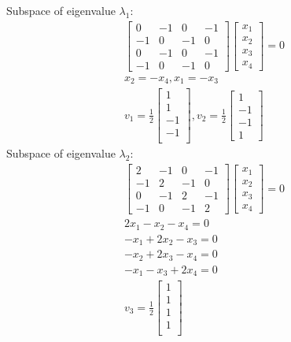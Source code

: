\documentclass{article}
\begin{document}
	Subspace of eigenvalue $\lambda_{1}$:
	\begin{gather*}
	\begin{bmatrix}	
	0 & -1 & 0 & -1\\
	-1 & 0 & -1 & 0\\
	0 & -1 & 0 & -1\\
	-1 & 0 & -1 & 0
	\end{bmatrix}\begin{bmatrix}
	x_{1}\\
	x_{2}\\
	x_{3}\\
	x_{4}
	\end{bmatrix}=0 \\
	x_{2}=-x_{4}, x_{1} = -x_{3} \\
	v_{1}=\frac{1}{2}\begin{bmatrix}
	1\\
	1\\
	-1\\
	-1\\
	\end{bmatrix},
	v_{2}=\frac{1}{2}\begin{bmatrix}
	1\\
	-1\\
	-1\\
	1
	\end{bmatrix}
	\end{gather*}
	Subspace of eigenvalue $\lambda_{2}$:
	\begin{gather*}
	\begin{bmatrix}	
	2 & -1 & 0 & -1\\
	-1 & 2 & -1 & 0\\
	0 & -1 & 2 & -1\\
	-1 & 0 & -1 & 2
	\end{bmatrix}\begin{bmatrix}
	x_{1}\\
	x_{2}\\
	x_{3}\\
	x_{4}
	\end{bmatrix}=0 \\
	2x_{1} -x_{2} -x_{4}=0\\
	-x_{1} + 2x_{2} -x_{3}=0\\
	-x_{2} + 2x_{3} -x_{4}=0\\
	-x_{1} -x_{3} + 2x_{4}=0\\
	v_{3}=\frac{1}{2}\begin{bmatrix}
	1\\
	1\\
	1\\
	1\\
	\end{bmatrix}
	\end{gather*}
\end{document}
